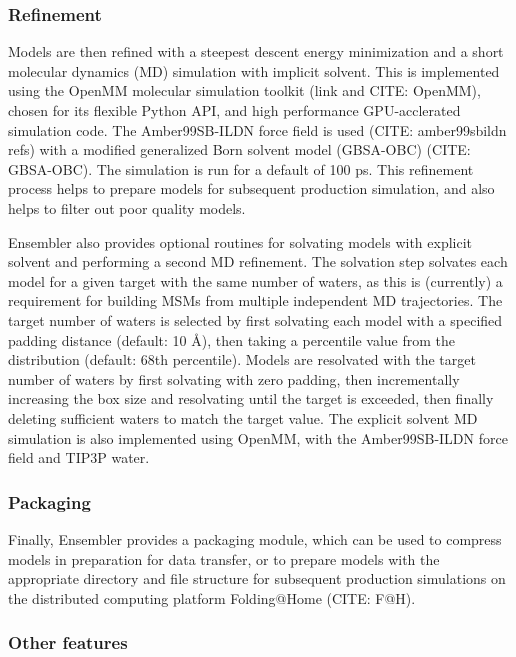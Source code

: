 \documentclass[aps,pre,twocolumn,nofootinbib,superscriptaddress,linenumbers]{revtex4-1}
\begin{document}
\subsubsection{Refinement}

Models are then refined with a steepest descent energy minimization and a short molecular dynamics (MD) simulation with implicit solvent.
This is implemented using the OpenMM molecular simulation toolkit (link and CITE: OpenMM), chosen for its flexible Python API, and high performance GPU-acclerated simulation code.
The Amber99SB-ILDN force field is used (CITE: amber99sbildn refs) with a modified generalized Born solvent model (GBSA-OBC) (CITE: GBSA-OBC).
The simulation is run for a default of 100 ps.
This refinement process helps to prepare models for subsequent production simulation, and also helps to filter out poor quality models.

Ensembler also provides optional routines for solvating models with explicit solvent and performing a second MD refinement.
The solvation step solvates each model for a given target with the same number of waters, as this is (currently) a requirement for building MSMs from multiple independent MD trajectories.
The target number of waters is selected by first solvating each model with a specified padding distance (default: 10 \AA), then taking a percentile value from the distribution (default: 68th percentile).
Models are resolvated with the target number of waters by first solvating with zero padding, then incrementally increasing the box size and resolvating until the target is exceeded, then finally deleting sufficient waters to match the target value.
The explicit solvent MD simulation is also implemented using OpenMM, with the Amber99SB-ILDN force field and TIP3P water.

\subsubsection{Packaging}

Finally, Ensembler provides a packaging module, which can be used to compress models in preparation for data transfer, or to prepare models with the appropriate directory and file structure for subsequent production simulations on the distributed computing platform Folding@Home (CITE: F@H).

\subsubsection{Other features}
\end{document}
